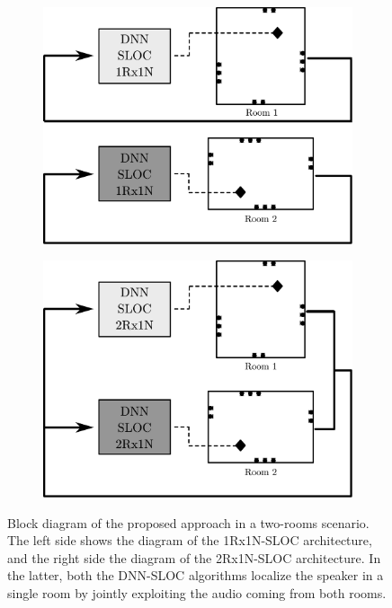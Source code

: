 \documentclass[review]{elsarticle}
\begin{document}
\begin{figure}[t]
	\centering
	\begin{subfigure}[b]{0.45\textwidth}
		\centering
	\includegraphics[width=\textwidth]{imgs/1Nx1R}\caption{}
	\end{subfigure}
	\hfill
	\begin{subfigure}[b]{0.45\textwidth}
	\centering
	\includegraphics[width=\textwidth]{imgs/2Nx1R_3}\caption{}
  \end{subfigure}
	\caption{Block diagram of the proposed approach in a two-rooms scenario. The left side shows the diagram of the 1Rx1N-SLOC architecture, and the right side the diagram of the 2Rx1N-SLOC architecture. In the latter, both the DNN-SLOC algorithms localize the speaker in a single room by jointly exploiting the audio coming from both rooms.}
	\label{fig:2Rx1R}
\end{figure}
\end{document}
